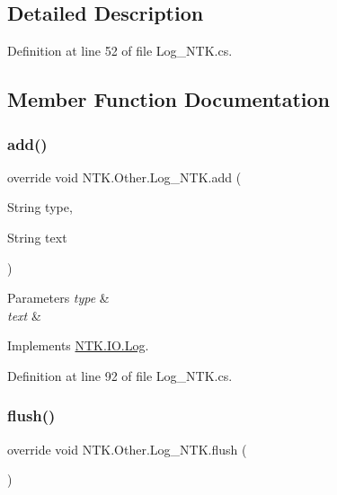 \subsection{Detailed Description}




Definition at line 52 of file Log\+\_\+\+N\+T\+K.\+cs.



\subsection{Member Function Documentation}
\mbox{\label{class_n_t_k_1_1_other_1_1_log___n_t_k_a30a4176c672c4325ca09a068f26a221c}} 
\subsubsection{\texorpdfstring{add()}{add()}}
{\footnotesize\ttfamily override void N\+T\+K.\+Other.\+Log\+\_\+\+N\+T\+K.\+add (\begin{DoxyParamCaption}\item[{String}]{type,  }\item[{String}]{text }\end{DoxyParamCaption})\hspace{0.3cm}{\ttfamily [virtual]}}






\begin{DoxyParams}{Parameters}
{\em type} & \\
\hline
{\em text} & \\
\hline
\end{DoxyParams}


Implements \mbox{\hyperlink{class_n_t_k_1_1_i_o_1_1_log_a5ffd860f0e7cc3631ae108fc5aca4836}{N\+T\+K.\+I\+O.\+Log}}.



Definition at line 92 of file Log\+\_\+\+N\+T\+K.\+cs.

\mbox{\label{class_n_t_k_1_1_other_1_1_log___n_t_k_acd0d0f0a9ceefbb23da69394d7153632}} 
\subsubsection{\texorpdfstring{flush()}{flush()}}
{\footnotesize\ttfamily override void N\+T\+K.\+Other.\+Log\+\_\+\+N\+T\+K.\+flush (\begin{DoxyParamCaption}{ }\end{DoxyParamCaption})\hspace{0.3cm}{\ttfamily [virtual]}}







